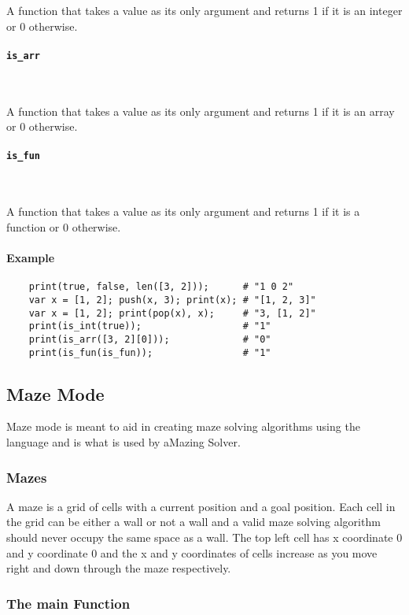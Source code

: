 A function that takes a value as its only argument and returns 1 if it is an integer or 0 otherwise.

\paragraph{\texttt{is\_arr}} \

A function that takes a value as its only argument and returns 1 if it is an array or 0 otherwise.

\paragraph{\texttt{is\_fun}} \

A function that takes a value as its only argument and returns 1 if it is a function or 0 otherwise.

\paragraph{Example}

\begin{verbatim}
    print(true, false, len([3, 2]));      # "1 0 2"
    var x = [1, 2]; push(x, 3); print(x); # "[1, 2, 3]"
    var x = [1, 2]; print(pop(x), x);     # "3, [1, 2]"
    print(is_int(true));                  # "1"
    print(is_arr([3, 2][0]));             # "0"
    print(is_fun(is_fun));                # "1"
\end{verbatim}

\subsection{Maze Mode}

Maze mode is meant to aid in creating maze solving algorithms using the language and is what is used by aMazing Solver.

\subsubsection{Mazes}

A maze is a grid of cells with a current position and a goal position. Each cell in the grid can be either a wall or not a wall and a valid maze solving algorithm should never occupy the same space as a wall. The top left cell has x coordinate 0 and y coordinate 0 and the x and y coordinates of cells increase as you move right and down through the maze respectively.

\subsubsection{The main Function}

